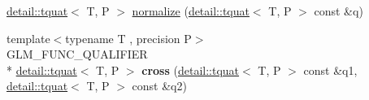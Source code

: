 \begin{DoxyCompactItemize}
\hyperlink{structglm_1_1detail_1_1tquat}{detail\-::tquat}$<$ T, P $>$ \hyperlink{group__gtc__quaternion_ga34ee289ca53a08207904e935104715d8}{normalize} (\hyperlink{structglm_1_1detail_1_1tquat}{detail\-::tquat}$<$ T, P $>$ const \&q)
\item 
\hypertarget{namespaceglm_ad70062c675bba04acb6b067c448f6b9e}{{\footnotesize template$<$typename T , precision P$>$ }\\G\-L\-M\-\_\-\-F\-U\-N\-C\-\_\-\-Q\-U\-A\-L\-I\-F\-I\-E\-R \\*
\hyperlink{structglm_1_1detail_1_1tquat}{detail\-::tquat}$<$ T, P $>$ {\bfseries cross} (\hyperlink{structglm_1_1detail_1_1tquat}{detail\-::tquat}$<$ T, P $>$ const \&q1, \hyperlink{structglm_1_1detail_1_1tquat}{detail\-::tquat}$<$ T, P $>$ const \&q2)}\label{namespaceglm_ad70062c675bba04acb6b067c448f6b9e}


\end{DoxyCompactItemize}
